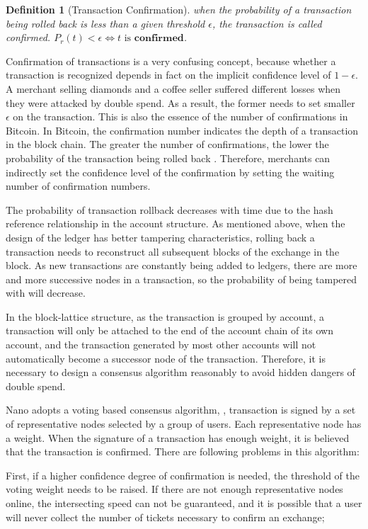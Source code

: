 \documentclass[UTF8,nofonts]{article}
\newtheorem{definition}{Definition}[section]
\begin{document}
\begin{multicols}{2}
\begin{definition}[Transaction Confirmation]
when the probability of a transaction being rolled back is less than a given threshold $\epsilon$, the transaction is called confirmed.
$P_{r}(t) < \epsilon \Leftrightarrow t \text{ is } \boldsymbol{confirmed}$.
\end{definition}

Confirmation of transactions is a very confusing concept, because whether a transaction is recognized depends in fact on the implicit confidence level of $1-\epsilon$. A merchant selling diamonds and a coffee seller suffered different losses when they were attacked by double spend. As a result, the former needs to set smaller $\epsilon$ on the transaction. This is also the essence of the number of confirmations in Bitcoin. In Bitcoin, the confirmation number indicates the depth of a transaction in the block chain. The greater the number of confirmations, the lower the probability of the transaction being rolled back \cite{nakamoto2008bitcoin}. Therefore, merchants can indirectly set the confidence level of the confirmation by setting the waiting number of confirmation numbers.

The probability of transaction rollback decreases with time due to the hash reference relationship in the account structure. As mentioned above, when the design of the ledger has better tampering characteristics, rolling back a transaction needs to reconstruct all subsequent blocks of the exchange in the block. As new transactions are constantly being added to ledgers, there are more and more successive nodes in a transaction, so the probability of being tampered with will decrease. 

In the block-lattice structure, as the transaction is grouped by account, a transaction will only be attached to the end of the account chain of its own account, and the transaction generated by most other accounts will not automatically become a successor node of the transaction. Therefore, it is necessary to design a consensus algorithm reasonably to avoid hidden dangers of double spend.

Nano adopts a voting based consensus algorithm, \cite{nano}, transaction is signed by a set of representative nodes selected by a group of users. Each representative node has a weight. When the signature of a transaction has enough weight, it is believed that the transaction is confirmed. There are following problems in this algorithm:

First, if a higher confidence degree of confirmation is needed, the threshold of the voting weight needs to be raised. If there are not enough representative nodes online, the intersecting speed can not be guaranteed, and it is possible that a user will never collect the number of tickets necessary to confirm an exchange;


\end{multicols}
\end{document}
